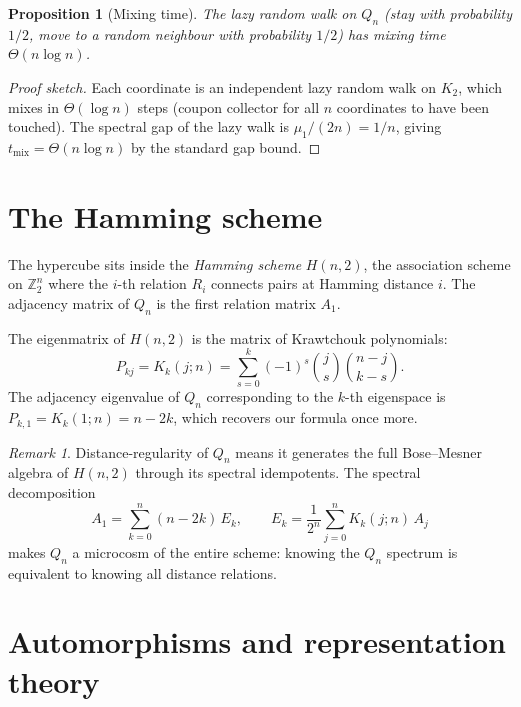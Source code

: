 \documentclass[11pt,a4paper]{article}
\theoremstyle{plain}
\newtheorem{proposition}[theorem]{Proposition}
\theoremstyle{definition}
\theoremstyle{remark}
\newtheorem{remark}[theorem]{Remark}
\newcommand{\Z}{\mathbb{Z}}
\begin{document}
\begin{proposition}[Mixing time]
The lazy random walk on $Q_n$ (stay with probability $1/2$, move to a
random neighbour with probability $1/2$) has mixing time
$\Theta(n \log n)$.
\end{proposition}

\begin{proof}[Proof sketch]
Each coordinate is an independent lazy random walk on $K_2$, which mixes in
$\Theta(\log n)$ steps (coupon collector for all $n$ coordinates to have
been touched). The spectral gap of the lazy walk is $\mu_1 / (2n) = 1/n$,
giving $t_{\mathrm{mix}} = \Theta(n \log n)$ by the standard gap bound.
\end{proof}


\section{The Hamming scheme}

The hypercube sits inside the \emph{Hamming scheme} $H(n, 2)$, the
association scheme on $\Z_2^n$ where the $i$-th relation $R_i$ connects
pairs at Hamming distance $i$. The adjacency matrix of $Q_n$ is the first
relation matrix $A_1$.

The eigenmatrix of $H(n, 2)$ is the matrix of Krawtchouk polynomials:
\[
  P_{kj} = K_k(j; n) = \sum_{s=0}^{k} (-1)^s \binom{j}{s}
  \binom{n-j}{k-s}.
\]
The adjacency eigenvalue of $Q_n$ corresponding to the $k$-th eigenspace is
$P_{k,1} = K_k(1; n) = n - 2k$, which recovers our formula once more.

\begin{remark}
Distance-regularity of $Q_n$ means it generates the full Bose--Mesner
algebra of $H(n, 2)$ through its spectral idempotents.
The spectral decomposition
\[
  A_1 = \sum_{k=0}^n (n-2k)\, E_k, \qquad
  E_k = \frac{1}{2^n} \sum_{j=0}^n K_k(j; n)\, A_j
\]
makes $Q_n$ a microcosm of the entire scheme: knowing the $Q_n$ spectrum is
equivalent to knowing all distance relations.
\end{remark}


\section{Automorphisms and representation theory}
\end{document}
